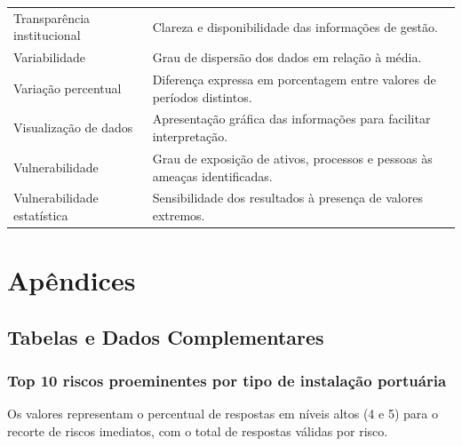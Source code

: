 \documentclass[
  portuguese,
  letterpaper,
  DIV=11,
  numbers=noendperiod]{scrreprt}
\begin{document}
\begin{longtable}[]{@{}
  >{\raggedright\arraybackslash}p{}
  >{\raggedright\arraybackslash}p{}@{}}
Transparência institucional & Clareza e disponibilidade das informações
de gestão. \\
Variabilidade & Grau de dispersão dos dados em relação à média. \\
Variação percentual & Diferença expressa em porcentagem entre valores de
períodos distintos. \\
Visualização de dados & Apresentação gráfica das informações para
facilitar interpretação. \\
Vulnerabilidade & Grau de exposição de ativos, processos e pessoas às
ameaças identificadas. \\
Vulnerabilidade estatística & Sensibilidade dos resultados à presença de
valores extremos. \\
\end{longtable}


\chapter{Apêndices}\label{apuxeandices}

\section{Tabelas e Dados
Complementares}\label{tabelas-e-dados-complementares}

\subsection{Top 10 riscos proeminentes por tipo de instalação
portuária}\label{top-10-riscos-proeminentes-por-tipo-de-instalauxe7uxe3o-portuuxe1ria}

Os valores representam o percentual de respostas em níveis altos (4 e 5)
para o recorte de riscos imediatos, com o total de respostas válidas por
risco.
\end{document}
